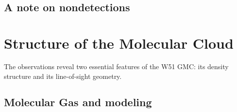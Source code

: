% 


\subsection{A note on nondetections}

\section{Structure of the Molecular Cloud}
The \formaldehyde observations reveal two essential features of the W51 GMC:
its density structure and its line-of-sight geometry.

\subsection{Molecular Gas and \formaldehyde modeling}
\label{sec:h2co}

